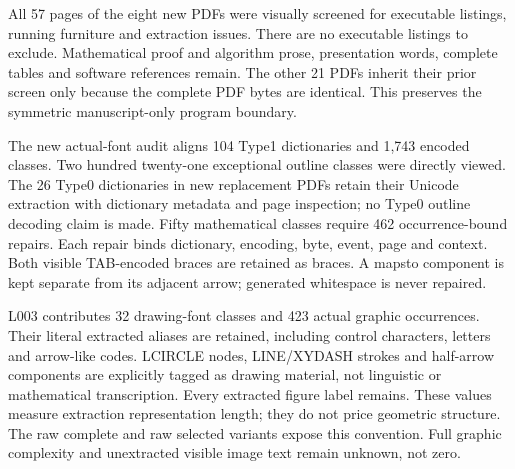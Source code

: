 \documentclass[10pt]{article}
\begin{document}
All 57 pages of the eight new PDFs were visually screened for executable
listings, running furniture and extraction issues. There are no executable
listings to exclude. Mathematical proof and algorithm prose, presentation words,
complete tables and software references remain. The other 21 PDFs inherit their
prior screen only because the complete PDF bytes are identical. This preserves
the symmetric manuscript-only program boundary.

The new actual-font audit aligns 104 Type1 dictionaries and 1,743 encoded
classes. Two hundred twenty-one exceptional outline classes were directly
viewed. The 26 Type0 dictionaries in new replacement PDFs retain their Unicode
extraction with dictionary metadata and page inspection; no Type0 outline
decoding claim is made. Fifty mathematical classes require 462 occurrence-bound
repairs. Each repair binds dictionary, encoding, byte, event, page and context.
Both visible TAB-encoded braces are retained as braces. A mapsto component is
kept separate from its adjacent arrow; generated whitespace is never repaired.

L003 contributes 32 drawing-font classes and 423 actual graphic occurrences.
Their literal extracted aliases are retained, including control characters,
letters and arrow-like codes. LCIRCLE nodes, LINE/XYDASH strokes and half-arrow
components are explicitly tagged as drawing material, not linguistic or
mathematical transcription. Every extracted figure label remains. These values
measure extraction representation length; they do not price geometric structure.
The raw complete and raw selected variants expose this convention. Full graphic
complexity and unextracted visible image text remain unknown, not zero.
\end{document}
